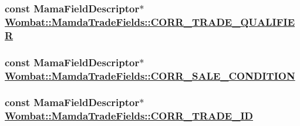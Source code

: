 \hypertarget{classWombat_1_1MamdaTradeFields_680194565d0cd7c7a61ba9c36955bc4c}{
\subsubsection[CORR\_\-TRADE\_\-QUALIFIER]{\setlength{\rightskip}{0pt plus 5cm}const Mama\-Field\-Descriptor$\ast$ \hyperlink{classWombat_1_1MamdaTradeFields_680194565d0cd7c7a61ba9c36955bc4c}{Wombat::Mamda\-Trade\-Fields::CORR\_\-TRADE\_\-QUALIFIER}}}
\label{classWombat_1_1MamdaTradeFields_680194565d0cd7c7a61ba9c36955bc4c}


\hypertarget{classWombat_1_1MamdaTradeFields_40c013ec1bc3127ce7f9558214a38a77}{
\subsubsection[CORR\_\-SALE\_\-CONDITION]{\setlength{\rightskip}{0pt plus 5cm}const Mama\-Field\-Descriptor$\ast$ \hyperlink{classWombat_1_1MamdaTradeFields_40c013ec1bc3127ce7f9558214a38a77}{Wombat::Mamda\-Trade\-Fields::CORR\_\-SALE\_\-CONDITION}}}
\label{classWombat_1_1MamdaTradeFields_40c013ec1bc3127ce7f9558214a38a77}


\hypertarget{classWombat_1_1MamdaTradeFields_fbcd6a93c569892c7ba3c93a1d6f5ceb}{
\subsubsection[CORR\_\-TRADE\_\-ID]{\setlength{\rightskip}{0pt plus 5cm}const Mama\-Field\-Descriptor$\ast$ \hyperlink{classWombat_1_1MamdaTradeFields_fbcd6a93c569892c7ba3c93a1d6f5ceb}{Wombat::Mamda\-Trade\-Fields::CORR\_\-TRADE\_\-ID}}}
\label{classWombat_1_1MamdaTradeFields_fbcd6a93c569892c7ba3c93a1d6f5ceb}


